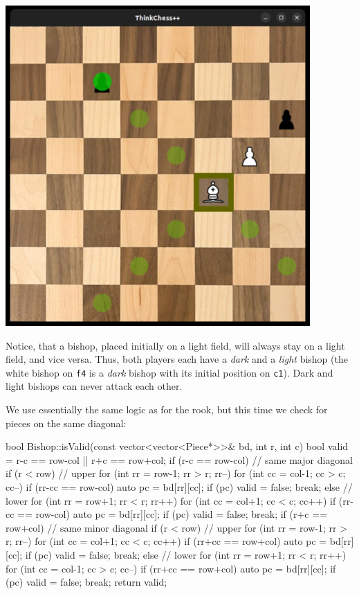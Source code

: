 \begin{center}
\includegraphics[width=.5\linewidth]{img/bishop.jpg}
\end{center}

Notice, that a bishop, placed initially on a light field, will always stay on a light field,
and vice versa.
Thus, both players each have a \emph{dark} and a \emph{light} bishop (the white bishop on
\texttt{f4} is a \emph{dark} bishop with its initial position on \texttt{c1}).
Dark and light bishops can never attack each other.

We use essentially the same logic as for the rook, but this time we check for pieces on
the same diagonal:

\begin{cpp}
bool Bishop::isValid(const vector<vector<Piece*>>& bd, int r, int c) {
  bool valid = r-c == row-col || r+c == row+col;
  if (r-c == row-col) { // same major diagonal
    if (r < row) { // upper
      for (int rr = row-1; rr > r; rr--) {
        for (int cc = col-1; cc > c; cc--) {
          if (rr-cc == row-col) {
            auto pc = bd[rr][cc];
            if (pc) { valid = false; break; }
          }
        }
      }
    } else { // lower
      for (int rr = row+1; rr < r; rr++) {
        for (int cc = col+1; cc < c; cc++) {
          if (rr-cc == row-col) {
            auto pc = bd[rr][cc];
            if (pc) { valid = false; break; }
          }
        }
      }
    }
  }
  if (r+c == row+col) { // same minor diagonal
    if (r < row) { // upper
      for (int rr = row-1; rr > r; rr--) {
        for (int cc = col+1; cc < c; cc++) {
          if (rr+cc == row+col) {
            auto pc = bd[rr][cc];
            if (pc) { valid = false; break; }
          }
        }
      }
    } else { // lower
      for (int rr = row+1; rr < r; rr++) {
        for (int cc = col-1; cc > c; cc--) {
          if (rr+cc == row+col) {
            auto pc = bd[rr][cc];
            if (pc) { valid = false; break; }
          }
        }
      }
    }
  }
  return valid;
}
\end{cpp}

